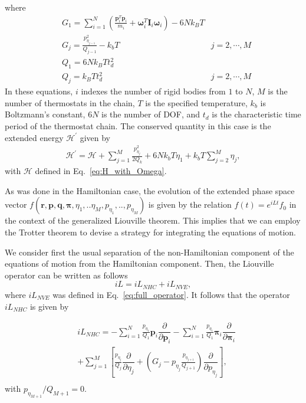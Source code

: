 \documentclass[aip,jcp,reprint,amsmath,amssymb]{revtex4-1}
\newcommand{\mt}[1]{\boldsymbol{\mathbf{#1}}}           %
\newcommand{\vt}[1]{\boldsymbol{\mathbf{#1}}}           %
\newcommand{\tr}[1]{#1^T}                               %
\newcommand{\diff}[2]{\dfrac{\partial #1}{\partial #2}} %
\begin{document}
where
\begin{align*}
&G_1 = \sum_{i=1}^N \left( \frac{\tr{\vt p}_i{\vt p}_i}{m_i} + \tr{\vt \omega}_i \mt I_i \vt \omega_i \right) - 6 N k_B T \\
&G_j = \frac{p_{\eta_{j-1}}^2}{Q_{j-1}} - k_b T &j = 2,\cdots,M \\
&Q_1 = 6 N k_B T t_d^2 \\
&Q_j = k_B T t_d^2 &j = 2,\cdots,M
\end{align*}
In these equations, $i$ indexes the number of rigid bodies from $1$ to $N$, $M$ is the number of thermostats in the chain, $T$ is the specified temperature, $k_b$ is Boltzmann's constant, $6N$ is the number of DOF, and $t_d$ is the characteristic time period of the thermostat chain. The conserved quantity in this case is the extended energy $\mathcal{H}^\prime$ given by
\begin{align*}
\mathcal{H}^\prime = \mathcal{H} + \sum_{j=1}^{M}\frac{p_{\eta_j}^2}{2Q_k} + 6Nk_bT\eta_1 + k_bT\sum_{j=2}^M \eta_j,
\end{align*}
with $\mathcal{H}$ defined in Eq.~\ref{eq:H_with_Omega}. 

As was done in the Hamiltonian case, the evolution of the extended phase space vector $ f(\vt r, \vt p, \vt q, \vt \pi, \eta_1,.. \eta_M, p_{\eta_1},..,p_{\eta_M}) $ is given by the relation $f(t) = e^{i L t}f_0$ in the context of the generalized Liouville theorem\cite{Tuckerman_1999}. This implies that we can employ the Trotter theorem to devise a strategy for integrating the equations of motion. 

We consider first the usual separation of the non-Hamiltonian component of the equations of motion from the Hamiltonian component. Then, the Liouville operator can be written as follows
\[
i L = i L_{NHC} + i L_{NVE},
\]
where $i L_{NVE}$ was defined in Eq.~\ref{eq:full_operator}. It follows that the operator $ i L_{NHC} $ is given by

\begin{equation}
\begin{split}
& i L_{NHC} = -\sum_{i=1}^{N} \frac{p_{\eta_1}}{Q_1} \vt p_i \diff{}{\vt p_i} - \sum_{i=1}^{N} \frac{p_{\eta_1}}{Q_1} \vt \pi_i \diff{}{\vt \pi_i} \\
& + \sum_{j=1}^{M}\left[\frac{p_{\eta_j}}{Q_j}\diff{}{\eta_j} + \left(G_j - p_{\eta_j} \frac{p_{\eta_{j+1}}} {Q_{j+1}}\right) \diff{}{p_{\eta_j}}\right],\\
\end{split}
\end{equation}
with $p_{\eta_{M+1}}/Q_{M+1} = 0$.
\end{document}
